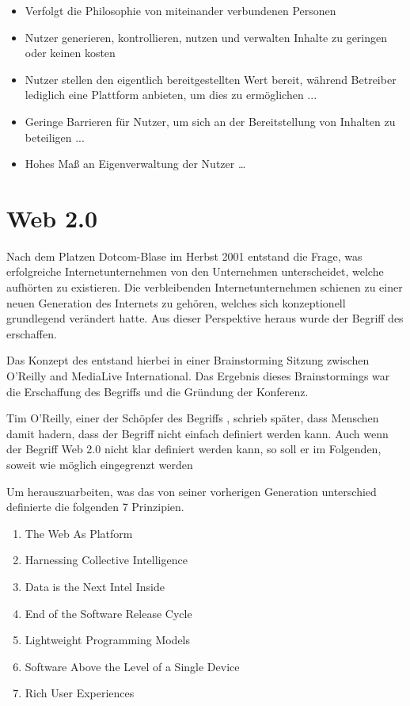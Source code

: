 \begin{itemize}
\item Verfolgt die Philosophie von miteinander verbundenen Personen \parencite[S. 8]{turban:sc}
\item Nutzer generieren, kontrollieren, nutzen und verwalten Inhalte zu geringen
oder keinen kosten \parencite[S. 8]{turban:sc}
\item Nutzer stellen den eigentlich bereitgestellten Wert bereit, während Betreiber lediglich eine Plattform anbieten, um dies zu ermöglichen ...
\item Geringe Barrieren für Nutzer, um sich an der Bereitstellung von Inhalten zu
beteiligen ...
\item Hohes Maß an Eigenverwaltung der Nutzer …
\end{itemize}


\section{Web 2.0}

Nach dem Platzen Dotcom-Blase im Herbst 2001 entstand die Frage, was erfolgreiche Internetunternehmen von den Unternehmen unterscheidet, welche aufhörten zu existieren. Die verbleibenden Internetunternehmen schienen zu einer neuen Generation des Internets zu gehören, welches sich konzeptionell grundlegend verändert hatte. Aus dieser Perspektive heraus wurde der Begriff des  erschaffen.\\
\parencite{oreilly:web20}

Das Konzept des  entstand hierbei in einer Brainstorming Sitzung zwischen O'Reilly and MediaLive International. Das Ergebnis dieses Brainstormings war die Erschaffung des Begriffs  und die Gründung der  Konferenz.\\
\parencite{oreilly:web20}

Tim O'Reilly, einer der Schöpfer des Begriffs , schrieb später, dass Menschen damit hadern, dass der Begriff  nicht einfach definiert werden kann. \parencite{oreilly:levels-of-web20} Auch wenn der Begriff Web 2.0 nicht klar definiert werden kann, so soll er im Folgenden, soweit wie möglich eingegrenzt werden

Um herauszuarbeiten, was das  von seiner vorherigen Generation unterschied definierte \textcite{oreilly:web20} die folgenden 7 Prinzipien.

\begin{enumerate}
	\item The Web As Platform
	\item Harnessing Collective Intelligence
	\item Data is the Next Intel Inside
	\item End of the Software Release Cycle
	\item Lightweight Programming Models
	\item Software Above the Level of a Single Device
	\item Rich User Experiences
\end{enumerate}

